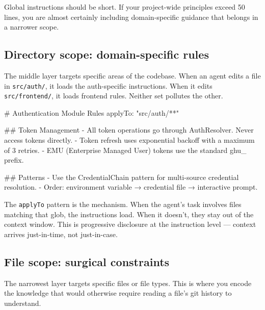 \documentclass[
  a4paper,
  DIV=11,
  numbers=noendperiod]{scrreprt}
\newenvironment{Shaded}{\begin{snugshade}}{\end{snugshade}}
\newcommand{\FunctionTok}[1]{\textcolor[rgb]{0.28,0.35,0.67}{#1}}
\newcommand{\InformationTok}[1]{\textcolor[rgb]{0.37,0.37,0.37}{#1}}
\newcommand{\NormalTok}[1]{\textcolor[rgb]{0.00,0.23,0.31}{#1}}
\newcommand{\SpecialStringTok}[1]{\textcolor[rgb]{0.13,0.47,0.30}{#1}}
\begin{document}
Global instructions should be short. If your project-wide principles
exceed 50 lines, you are almost certainly including domain-specific
guidance that belongs in a narrower scope.

\subsection{Directory scope: domain-specific
rules}\label{directory-scope-domain-specific-rules}

The middle layer targets specific areas of the codebase. When an agent
edits a file in \texttt{src/auth/}, it loads the auth-specific
instructions. When it edits \texttt{src/frontend/}, it loads frontend
rules. Neither set pollutes the other.

\begin{Shaded}
\begin{Highlighting}[]
\FunctionTok{\# Authentication Module Rules}
\NormalTok{applyTo: "src/auth/**"}

\FunctionTok{\#\# Token Management}
\SpecialStringTok{{-} }\NormalTok{All token operations go through AuthResolver. Never access tokens directly.}
\SpecialStringTok{{-} }\NormalTok{Token refresh uses exponential backoff with a maximum of 3 retries.}
\SpecialStringTok{{-} }\NormalTok{EMU (Enterprise Managed User) tokens use the standard }\InformationTok{\textasciigrave{}ghu\_\textasciigrave{}}\NormalTok{ prefix.}

\FunctionTok{\#\# Patterns}
\SpecialStringTok{{-} }\NormalTok{Use the CredentialChain pattern for multi{-}source credential resolution.}
\SpecialStringTok{{-} }\NormalTok{Order: environment variable → credential file → interactive prompt.}
\end{Highlighting}
\end{Shaded}

The \texttt{applyTo} pattern is the mechanism. When the agent's task
involves files matching that glob, the instructions load. When it
doesn't, they stay out of the context window. This is progressive
disclosure at the instruction level --- context arrives just-in-time,
not just-in-case.

\subsection{File scope: surgical
constraints}\label{file-scope-surgical-constraints}

The narrowest layer targets specific files or file types. This is where
you encode the knowledge that would otherwise require reading a file's
git history to understand.
\end{document}
